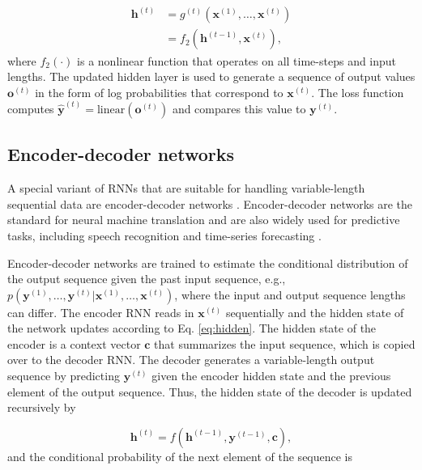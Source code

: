 \documentclass[hidelinks,12pt]{article}
\begin{document}
\begin{align}
\mathbf{h}^{(t)} &= g^{(t)} \left(\mathbf{x}^{(1)}, \ldots, \mathbf{x}^{(t)} \right) \nonumber \\ 
&= f_2 \left( \mathbf{h}^{(t-1)}, \mathbf{x}^{(t)} \right), \label{eq:hidden}
\end{align} where $f_2(\cdot)$ is a nonlinear function that operates on all time-steps and input lengths. The updated hidden layer is used to generate a sequence of output values $\mathbf{o}^{(t)}$ in the form of log probabilities that correspond to $\mathbf{x}^{(t)}$. The loss function computes $\mathbf{\hat{y}}^{(t)} = \mathrm{linear} (\mathbf{o}^{(t)})$ and compares this value to $\mathbf{y}^{(t)}$.

\subsection{Encoder-decoder networks}

A special variant of RNNs that are suitable for handling variable-length sequential data are encoder-decoder networks \citep{cho2014learning}. Encoder-decoder networks are the standard for neural machine translation \citep{bahdanau2014neural,vinyals2014grammar} and are also widely used for predictive tasks, including speech recognition \citep{chorowski2015attention} and time-series forecasting \citep{zhu2017deep}. 

Encoder-decoder networks are trained to estimate the conditional distribution of the output sequence given the past input sequence, e.g., $p (\mathbf{y}^{(1)}, \ldots, \mathbf{y}^{(t)} | \mathbf{x}^{(1)}, \ldots, \mathbf{x}^{(t)})$, where the input and output sequence lengths can differ. The encoder RNN reads in $\mathbf{x}^{(t)}$ sequentially and the hidden state of the network updates according to Eq. \ref{eq:hidden}. The hidden state of the encoder is a context vector $\mathbf{c}$ that summarizes the input sequence, which is copied over to the decoder RNN. The decoder generates a variable-length output sequence by predicting $\mathbf{y}^{(t)}$ given the encoder hidden state and the previous element of the output sequence. Thus, the hidden state of the decoder is updated recursively by

\begin{equation}
\mathbf{h}^{(t)} = f \left( \mathbf{h}^{(t-1)}, \mathbf{y}^{(t-1)}, \mathbf{c} \right), \label{eq:decoder}
\end{equation} and the conditional probability of the next element of the sequence is 
\end{document}
